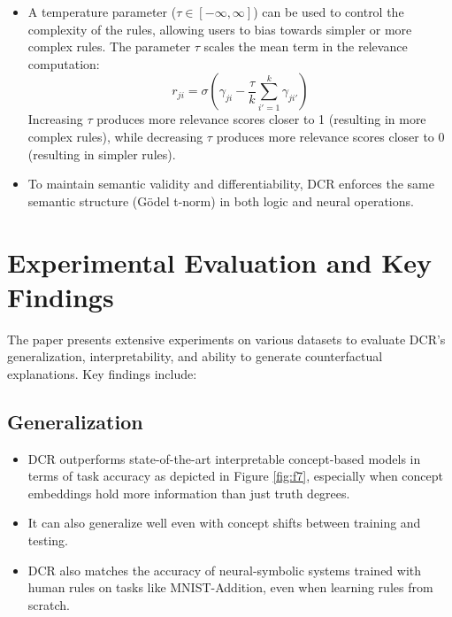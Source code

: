 \documentclass[10pt, oneside]{article}
\begin{document}
\begin{itemize}
   \item A temperature parameter ($\tau \in [-\infty, \infty]$) can be used to control the complexity of the rules, allowing users to bias towards simpler or more complex rules. The parameter $\tau$ scales the mean term in the relevance computation:
   \begin{equation}
      r_{ji} = \sigma\left(\gamma_{ji} - \frac{\tau}{k} \sum_{i'=1}^k \gamma_{ji'}\right)
   \end{equation}
   Increasing $\tau$ produces more relevance scores closer to 1 (resulting in more complex rules), while decreasing $\tau$ produces more relevance scores closer to 0 (resulting in simpler rules).

   \item To maintain semantic validity and differentiability, DCR enforces the same semantic structure (Gödel t-norm) in both logic and neural operations.
\end{itemize}

\section{Experimental Evaluation and Key Findings}
The paper \cite{dcr} presents extensive experiments on various datasets to evaluate DCR's generalization, interpretability, and ability to generate counterfactual explanations. Key findings include:

\subsection{Generalization}
\begin{itemize}
   \item DCR outperforms state-of-the-art interpretable concept-based models in terms of task accuracy as depicted in Figure \ref{fig:f7}, especially when concept embeddings hold more information than just truth degrees.
   \item It can also generalize well even with concept shifts between training and testing.
   \item DCR also matches the accuracy of neural-symbolic systems trained with human rules on tasks like MNIST-Addition, even when learning rules from scratch.
\end{itemize}
\end{document}
